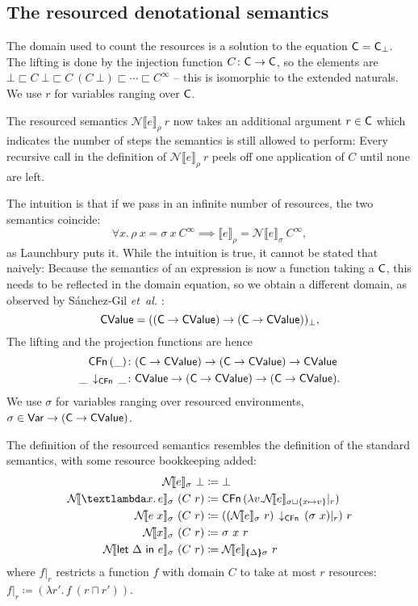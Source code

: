 \documentclass{jfp1}
\theoremstyle{nonumberbreak}
\newcommand{\sVar}   {\text{\textsf{Var}}}
\newcommand{\sCValue}{\text{\textsf{CValue}}}
\newcommand{\sC}     {\text{\textsf{C}}}
\newcommand{\sCFn}[1]{\text{\textsf{CFn}}\,(#1)}
\newcommand{\sCFnProj}[2]{#1\,\downarrow_{\text{\textsf{CFn}}}\,#2}
\newcommand{\keyword}[1]{\text{\textsf{#1}}}
\newcommand{\sApp}[2]{#1\;#2}
\newcommand{\sLam}[2]{\text{\textlambda} #1.\, #2}
\newcommand{\sLet}[2]{\keyword{let}~#1~\keyword{in}~#2}
\newcommand{\dsem}[2]{\llbracket #1 \rrbracket_{#2}}
\newcommand{\esem}[1]{\{\!\!\!\{#1\}\!\!\!\}}
\newcommand{\dsemr}[2]{\mathcal N\!\llbracket #1 \rrbracket_{#2}}
\newcommand{\Crestr}[2]{ #1 |_{#2}}
\begin{document}
\subsection{The resourced denotational semantics}

The domain used to count the resources is a solution to the equation $\sC = \sC_\bot$. The lifting is done by the injection function $C \colon \sC \to \sC$, so the elements are $\bot \sqsubset C~\bot \sqsubset C~(C~\bot) \sqsubset \cdots \sqsubset C^\infty$ – this is isomorphic to the extended naturals. We use $r$ for variables ranging over $\sC$.


The resourced semantics $\dsemr{e}{\rho}~r$ now takes an additional argument $r \in \sC$ which indicates the number of steps the semantics is still allowed to perform: Every recursive call in the definition of $\dsemr{e}{\rho}~r$ peels off one application of $C$ until none are left.

The intuition is that if we pass in an infinite number of resources, the two semantics coincide: \[
\forall x.\, \rho~x = \sigma~x~C^\infty \implies \dsem{e}{\rho} = \dsemr{e}{\sigma}~C^\infty,
\]
as Launchbury puts it. While the intuition is true, it cannot be stated that naively: Because the semantics of an expression is now a function taking a $\sC$, this needs to be reflected in the domain equation, so we obtain a different domain, as observed by S{\'a}nchez-Gil {\em et~al.} :
\[
\sCValue = ((\sC \to \sCValue) \to (\sC \to \sCValue))_\bot,
\]
The lifting and the projection functions are hence
\begin{align*}
\sCFn \_ &\colon (\sC \to \sCValue) \to (\sC \to \sCValue) \to \sCValue \\
\sCFnProj{\_}{\_} &\colon \sCValue \to (\sC\to\sCValue) \to (\sC \to \sCValue).
\end{align*}
We use $\sigma$ for variables ranging over resourced environments, $\sigma \in \sVar \to (\sC \to \sCValue)$.


The definition of the resourced semantics resembles the definition of the standard semantics, with some resource bookkeeping added:
\begin{align*}
\dsemr{e}\sigma~ \bot &\coloneqq \bot\\
\dsemr{\sLam x e}\sigma ~ (C~r) &\coloneqq \sCFn{\lambda v. \Crestr{\dsemr e {\sigma \sqcup \{x \mapsto v\}}} r}\\
\dsemr{\sApp e  x}\sigma ~ (C~r) &\coloneqq (\sCFnProj {(\dsemr e \sigma~r)}{\Crestr{(\sigma~x)} r})~r\\
\dsemr{x}\sigma ~ (C~r) &\coloneqq \sigma~x~r\\
\dsemr{\sLet{\Delta}e}\sigma ~ (C~r) &\coloneqq \dsemr e {\esem{\Delta}\sigma}~r
\end{align*}
where $\Crestr{f}{r}$ restricts a function $f$ with domain $C$ to take at most $r$ resources: $\Crestr f r \coloneqq (\lambda r'.\, f ~(r \sqcap r'))$.
\end{document}
